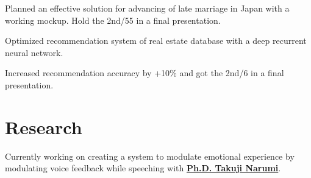 \documentclass[letterpaper]{deedy-resume} %
\begin{document}
\begin{minipage}[t]{0.66\textwidth}
%

\vspace{2mm} %


\begin{tightitemize}
\item Planned an effective solution for advancing of late marriage in Japan with a working mockup. Hold the 2nd/55 in a final presentation.
\end{tightitemize}

\vspace{2mm} %

\begin{tightitemize}
\item Optimized recommendation system of real estate database with a deep recurrent neural network.
\item Increased recommendation accuracy by +10\% and got the 2nd/6 in a final presentation.
\end{tightitemize}


\section{Research}

Currently working on creating a system to modulate emotional experience by modulating voice feedback while speeching with \textbf{\href{http://www.cs.cornell.edu/~ashesh/}{Ph.D. Takuji Narumi}}. 


\end{minipage}
\end{document}
